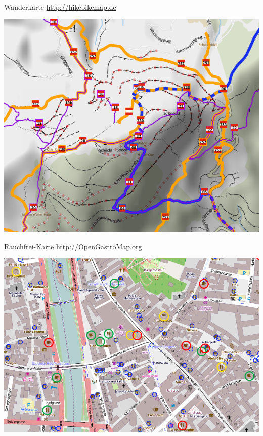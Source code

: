\documentclass{beamer}
\begin{document}
\begin{frame}{Wanderkarte}
\url{http://hikebikemap.de}

\begin{center}
\includegraphics[width=.57\paperwidth]{hike_schoeckl.png}
\end{center}
\end{frame}

\begin{frame}{Rauchfrei-Karte}
\url{http://OpenGastroMap.org}

\begin{center}
\includegraphics[width=.65\paperwidth]{rauchfrei.png}
\end{center}
\end{frame}
\end{document}
